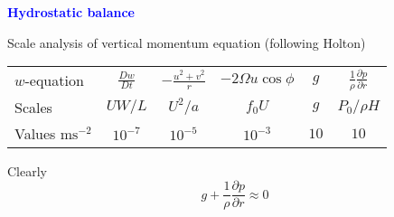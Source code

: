 \documentclass[a4]{seminar}
\newcommand{\B}[1]{\textcolor{blue}{#1}}
\begin{document}
\begin{slide}

\B{\bf Hydrostatic balance}

\vspace{3mm}

Scale analysis of vertical momentum equation (following Holton)

\vspace{1mm}

\begin{center}
\begin{tabular}{|lccccc|}
\hline
\(w\)-equation
&
\(\frac{Dw}{Dt}\)
&
\(-\frac{u^2 + v^2}{r}\)
&
\(-2 \Omega u \cos \phi\)
&
\(g\)
&
\(\frac{1}{\rho} \frac{\partial p}{\partial r}\)
\\
Scales
&
\(UW/L\)
&
\(U^2 / a\)
&
\(f_0 U\)
&
\(g\)
&
\(P_0 / \rho H \)
\\
Values \( \mathrm{ms}^{-2}\)
&
\(10^{-7}\)
&
\(10^{-5}\)
&
\(10^{-3}\)
&
\(10\)
&
\(10\)
\\
\hline
\end{tabular}
\end{center}

\vspace{3mm}

Clearly
\begin{displaymath}
g + \frac{1}{\rho} \frac{\partial p}{\partial r} \approx 0
\end{displaymath}


\end{slide}

\end{document}
